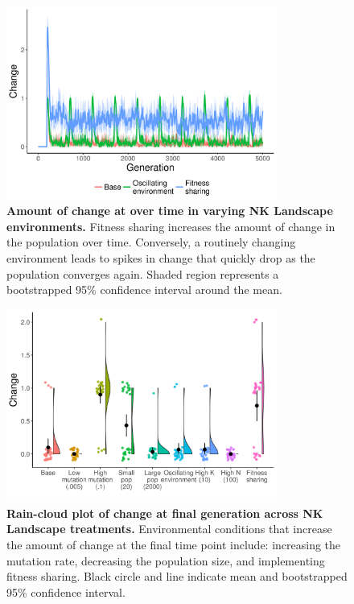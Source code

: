 \documentclass[letterpaper]{article}
\providecommand{\DIFaddbeginFL}{} %
\providecommand{\DIFaddendFL}{} %
\providecommand{\DIFdelbeginFL}{} %
\providecommand{\DIFdelendFL}{} %
\begin{document}
\begin{figure}
    \DIFdelbeginFL %
\DIFdelendFL \DIFaddbeginFL \centering
\includegraphics[width=3.5in]{figs/dolson.change_changing_environments.png}
\DIFaddendFL \caption{\textbf{Amount of change at over time in varying NK Landscape environments.} Fitness sharing increases the amount of change in the population over time. Conversely, a routinely changing environment leads to spikes in change that quickly drop as the population converges again. Shaded region represents a bootstrapped 95\% confidence interval around the mean.\DIFdelbeginFL %
\DIFdelendFL \label{change_time}\DIFaddbeginFL }
\DIFaddendFL \end{figure}

\begin{figure}
    \DIFdelbeginFL %
\DIFdelendFL \DIFaddbeginFL \centering
\includegraphics[width=3.5in]{figs/dolson.changeboxplots.png}
\DIFaddendFL \caption{\textbf{Rain-cloud plot of change at final generation across NK Landscape treatments.} Environmental conditions that increase the amount of change at the final time point include: increasing the mutation rate, decreasing the population size, and implementing fitness sharing. Black circle and line indicate mean and bootstrapped 95\% confidence interval.\DIFdelbeginFL %
\DIFdelendFL \label{change}\DIFaddbeginFL }
\DIFaddendFL \end{figure}
\end{document}
